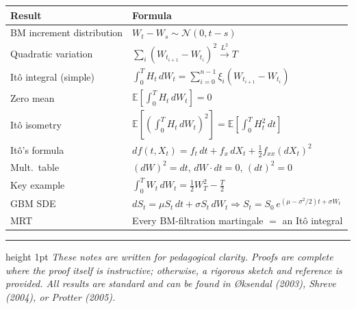 \documentclass[11pt,a4paper]{article}
\theoremstyle{definition}
\theoremstyle{plain}
\theoremstyle{remark}
\newcommand{\E}{\mathbb{E}}
\begin{document}
\begin{center}
\renewcommand{\arraystretch}{2.0}
\begin{tabular}{@{}ll@{}}
\toprule
\textbf{Result} & \textbf{Formula} \\
\midrule
BM increment distribution & $W_t - W_s \sim \mathcal{N}(0, t-s)$ \\
Quadratic variation & $\sum_i(W_{t_{i+1}}-W_{t_i})^2 \xrightarrow{L^2} T$ \\
Itô integral (simple) & $\displaystyle\int_0^T H_t\,dW_t = \sum_{i=0}^{n-1}\xi_i(W_{t_{i+1}}-W_{t_i})$ \\
Zero mean & $\displaystyle\E\left[\int_0^T H_t\,dW_t\right] = 0$ \\
Itô isometry & $\displaystyle\E\!\left[\!\left(\int_0^T H_t\,dW_t\right)^2\right] = \E\!\left[\int_0^T H_t^2\,dt\right]$ \\
Itô's formula & $\displaystyle df(t,X_t) = f_t\,dt + f_x\,dX_t + \tfrac{1}{2}f_{xx}(dX_t)^2$ \\
Mult.\ table & $(dW)^2 = dt$,\; $dW\cdot dt = 0$,\; $(dt)^2 = 0$ \\
Key example & $\displaystyle\int_0^T W_t\,dW_t = \tfrac{1}{2}W_T^2 - \tfrac{T}{2}$ \\
GBM SDE & $dS_t = \mu S_t\,dt + \sigma S_t\,dW_t \Rightarrow S_t = S_0\,e^{(\mu-\sigma^2/2)t+\sigma W_t}$ \\
MRT & Every BM-filtration martingale $=$ an Itô integral \\
\bottomrule
\end{tabular}
\end{center}

\vspace{2em}
\hrule height 1pt
\vspace{1em}
{\small\textit{These notes are written for pedagogical clarity. Proofs are complete where the proof itself is instructive; otherwise, a rigorous sketch and reference is provided. All results are standard and can be found in Øksendal (2003), Shreve (2004), or Protter (2005).}}
\end{document}
